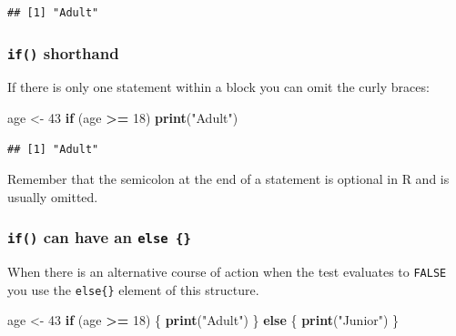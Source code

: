 \documentclass[]{book}
\newenvironment{Shaded}{\begin{snugshade}}{\end{snugshade}}
\newcommand{\ControlFlowTok}[1]{\textcolor[rgb]{0.13,0.29,0.53}{\textbf{#1}}}
\newcommand{\DecValTok}[1]{\textcolor[rgb]{0.00,0.00,0.81}{#1}}
\newcommand{\KeywordTok}[1]{\textcolor[rgb]{0.13,0.29,0.53}{\textbf{#1}}}
\newcommand{\NormalTok}[1]{#1}
\newcommand{\OperatorTok}[1]{\textcolor[rgb]{0.81,0.36,0.00}{\textbf{#1}}}
\newcommand{\StringTok}[1]{\textcolor[rgb]{0.31,0.60,0.02}{#1}}
\begin{document}
\begin{verbatim}
## [1] "Adult"
\end{verbatim}

\hypertarget{if-shorthand}{%
\subsubsection*{\texorpdfstring{\texttt{if()} shorthand}{if() shorthand}}\label{if-shorthand}}

If there is only one statement within a block you can omit the curly braces:

\begin{Shaded}
\begin{Highlighting}[]
\NormalTok{age <-}\StringTok{ }\DecValTok{43}
\ControlFlowTok{if}\NormalTok{ (age }\OperatorTok{>=}\StringTok{ }\DecValTok{18}\NormalTok{) }\KeywordTok{print}\NormalTok{(}\StringTok{"Adult"}\NormalTok{)}
\end{Highlighting}
\end{Shaded}

\begin{verbatim}
## [1] "Adult"
\end{verbatim}

Remember that the semicolon at the end of a statement is optional in R and is usually omitted.

\hypertarget{if-can-have-an-else}{%
\subsubsection*{\texorpdfstring{\texttt{if()} can have an \texttt{else\ \{\}}}{if() can have an else \{\}}}\label{if-can-have-an-else}}

When there is an alternative course of action when the test evaluates to \texttt{FALSE} you use the \texttt{else\{\}} element of this structure.

\begin{Shaded}
\begin{Highlighting}[]
\NormalTok{age <-}\StringTok{ }\DecValTok{43}
\ControlFlowTok{if}\NormalTok{ (age }\OperatorTok{>=}\StringTok{ }\DecValTok{18}\NormalTok{) \{}
    \KeywordTok{print}\NormalTok{(}\StringTok{"Adult"}\NormalTok{)}
\NormalTok{\} }\ControlFlowTok{else}\NormalTok{ \{}
    \KeywordTok{print}\NormalTok{(}\StringTok{"Junior"}\NormalTok{)}
\NormalTok{\}}
\end{Highlighting}
\end{Shaded}
\end{document}
